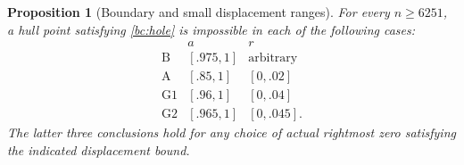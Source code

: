 \documentclass[11pt,reqno]{amsart}
\numberwithin{equation}{section}
\newtheorem{proposition}[theorem]{Proposition}
\theoremstyle{definition}
\theoremstyle{remark}
\begin{document}
\begin{proposition}[Boundary and small displacement ranges]\label{bc:boundary}
For every $n\geq6251$, a hull point satisfying \eqref{bc:hole} is
impossible in each of the following cases:
\begin{equation}\label{bc:boundary-scopes}
\begin{array}{c|c|c}
 &a&r\\ \hline
 \mathrm B&[.975,1]&\text{arbitrary}\\
 \mathrm A&[.85,1]&[0,.02]\\
 \mathrm {G1}&[.96,1]&[0,.04]\\
 \mathrm {G2}&[.965,1]&[0,.045].
\end{array}
\end{equation}
The latter three conclusions hold for any choice of actual rightmost
zero satisfying the indicated displacement bound.
\end{proposition}
\end{document}
